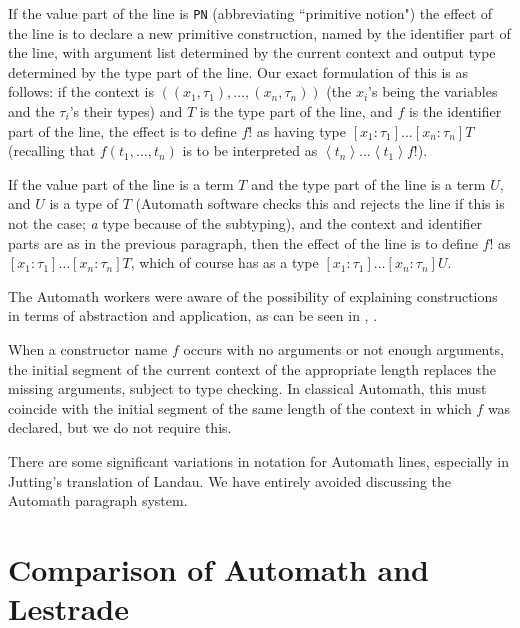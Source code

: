 \documentclass{article}
\begin{document}
If the value part of the line is {\tt PN} (abbreviating ``primitive notion") the effect of the line is to declare a new primitive construction, named by the identifier part of the line, with argument list determined by the current context and output type determined by the type part of the line.  Our exact formulation of this
is as follows:  if the context is $((x_1,\tau_1),\ldots,(x_n,\tau_n))$ (the $x_i$'s being the variables and the $\tau_i$'s their types) and $T$ is the type part of the line, and $f$ is the identifier part of the line, the effect is to define $f!$ as having type $[x_1:\tau_1]\ldots[x_n:\tau_n]T$ (recalling that
$f(t_1,\ldots,t_n)$ is to be interpreted as $\left<t_n\right>\ldots\left<t_1\right>f!$).



If the value part of the line is a term $T$ and the type part of the line is a term $U$, and $U$ is a type of $T$ (Automath software checks this and rejects the line if this is not the case; {\em a\/} type because of the subtyping), and the context and identifier parts are as in the previous paragraph,  then the effect of the line is to define $f!$ as $[x_1:\tau_1]\ldots[x_n:\tau_n]T$, which of course has as a type $[x_1:\tau_1]\ldots[x_n:\tau_n]U$.

The Automath workers were aware of the possibility of explaining constructions in terms of abstraction and application, as can be seen in \cite{autsl}, \cite{autlambda}.

When a constructor name $f$ occurs with no arguments or not enough arguments, the initial segment of the current context of the appropriate length replaces the missing arguments, subject to type checking.  In classical Automath, this must coincide with the initial segment of the same length of the context in which $f$ was declared, but we do not require this.

There are some significant variations in notation for Automath lines, especially in Jutting's translation of Landau.  We have entirely avoided discussing the Automath paragraph system.

\section{Comparison of Automath and Lestrade}
\end{document}

